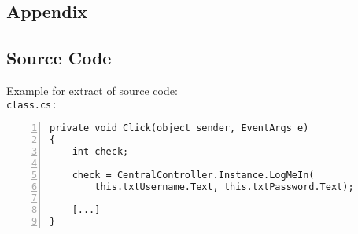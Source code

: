 

\begin{appendices}
\renewcommand{\appendixname}{APPENDIX}
\renewcommand{\appendixtocname}{\appendixname} 
\addappheadtotoc 


\part*{Appendix}

\chapter*{Source Code}

Example for extract of source code: \\

\texttt{class.cs:}
\begin{lstlisting}[basicstyle=\ttfamily,numbers=left,numberstyle=\footnotesize\ttfamily,backgroundcolor=\color{sourcegray}]
private void Click(object sender, EventArgs e)
{
    int check;
        
    check = CentralController.Instance.LogMeIn(
        this.txtUsername.Text, this.txtPassword.Text);
    
    [...]	
}
\end{lstlisting}

\end{appendices}